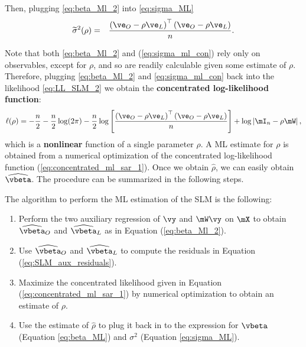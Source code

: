 \documentclass[english,12pt]{book}\usepackage[]{graphicx}\usepackage[]{xcolor}
\begin{document}
Then, plugging \eqref{eq:beta_Ml_2} into \eqref{eq:sigma_ML}
\begin{eqnarray}\label{eq:sigma_ml_con}
\widetilde{\sigma}^2(\rho) &=& \frac{\left(\ve_O - \rho\ve_L\right)^\top\left(\ve_O - \rho\ve_L\right)}{n}.
\end{eqnarray}

Note that both \eqref{eq:beta_Ml_2} and (\ref{eq:sigma_ml_con}) rely only on observables, except for $\rho$, and so are readily calculable given some estimate of $\rho$. Therefore, plugging \eqref{eq:beta_Ml_2} and \eqref{eq:sigma_ml_con} back into the likelihood \eqref{eq:LL_SLM_2}  we obtain the \textbf{concentrated log-likelihood function}:
\begin{equation}\label{eq:concentrated_ml_sar_1}
\ell(\rho)=-\frac{n}{2}-\frac{n}{2}\log(2\pi) - \frac{n}{2}\log\left[\frac{\left(\ve_O - \rho\ve_L\right)^\top\left(\ve_O - \rho\ve_L\right)}{n}\right] + \log\left|\mI_n - \rho\mW\right|,
\end{equation}	
%	
which is a \textbf{nonlinear} function of a single parameter $\rho$. A ML estimate for $\rho$ is obtained from a numerical optimization of the concentrated log-likelihood function (\ref{eq:concentrated_ml_sar_1}). Once we obtain $\widehat{\rho}$, we can easily obtain $\widehat{\vbeta}$.  The procedure can be summarized in the following steps.

\begin{algorithm}\label{algorithm:SLM}
The algorithm to perform the ML estimation of the SLM is the following: 
\begin{enumerate}
	\item Perform the two auxiliary regression of $\vy$ and $\mW\vy$ on $\mX$ to obtain $\widehat{\vbeta}_O$ and $\widehat{\vbeta}_L$ as in Equation (\ref{eq:beta_Ml_2}).
	\item Use $\widehat{\vbeta}_O$ and $\widehat{\vbeta}_L$ to compute the residuals in Equation (\ref{eq:SLM_aux_residuals}). 
	\item Maximize the concentrated likelihood given in Equation (\ref{eq:concentrated_ml_sar_1}) by numerical optimization to obtain an estimate of $\rho$.
	\item Use the estimate of $\widehat{\rho}$ to plug it back in to the expression for $\vbeta$ (Equation \ref{eq:beta_ML}) and $\sigma^2$	 (Equation \ref{eq:sigma_ML}).
\end{enumerate}	
\end{algorithm}
\end{document}
